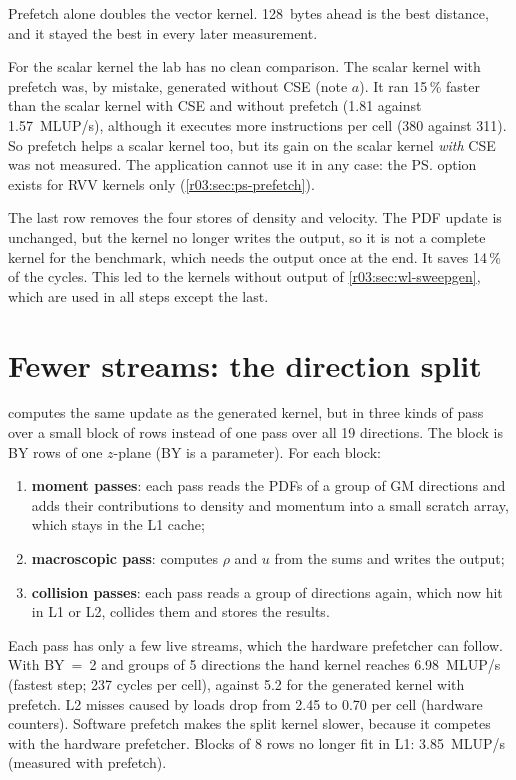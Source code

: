 Prefetch alone doubles the vector kernel. 128~bytes ahead is the best distance, and it stayed
the best in every later measurement.

For the scalar kernel the lab has no clean comparison. The scalar kernel with prefetch was, by
mistake, generated without CSE (note $a$). It ran 15\,\% faster than the scalar kernel with CSE
and without prefetch (1.81 against 1.57~MLUP/s), although it executes more instructions per cell
(380 against 311). So prefetch helps a scalar kernel too, but its gain on the scalar kernel
\emph{with} CSE was not measured. The application cannot use it in any case: the \ps{} option
exists for RVV kernels only (\cref{r03:sec:ps-prefetch}).

The last row removes the four stores of density and velocity. The PDF update is unchanged,
but the kernel no longer writes the output, so it is not a complete kernel for the benchmark,
which needs the output once at the end. It saves 14\,\% of the cycles. This led to the kernels
without output of \cref{r03:sec:wl-sweepgen}, which are used in all steps except the last.

\section{Fewer streams: the direction split}\label{r03:sec:lever-split}

 computes the same update as the generated
kernel, but in three kinds of pass over a small block of rows instead of one pass over all 19
directions. The block is BY rows of one $z$-plane (BY is a parameter). For each block:
\begin{enumerate}
  \item \textbf{moment passes}: each pass reads the PDFs of a group of GM directions and adds
        their contributions to density and momentum into a small scratch array, which stays in
        the L1 cache;
  \item \textbf{macroscopic pass}: computes $\rho$ and $u$ from the sums and writes the
        output;
  \item \textbf{collision passes}: each pass reads a group of directions again, which now hit
        in L1 or L2, collides them and stores the results.
\end{enumerate}
Each pass has only a few live streams, which the hardware prefetcher can follow. With
BY~=~2 and groups of 5 directions the hand kernel reaches 6.98~MLUP/s (fastest step; 237
cycles per cell), against 5.2 for the generated kernel with prefetch. L2 misses caused by
loads drop from 2.45 to 0.70 per cell (hardware counters). Software prefetch makes the split
kernel slower, because it competes with the hardware prefetcher. Blocks of 8 rows no longer
fit in L1: 3.85~MLUP/s (measured with prefetch).

